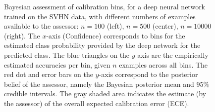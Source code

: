 \documentclass{article}
\begin{document}
\begin{figure}[h]
 \centering

\caption{Bayesian assessment of calibration bins, for a deep neural network trained on the SVHN data, with different numbers of examples available to the assessor: $n=100$ (left), $n=500$ (center), $n=10000$ (right). The $x$-axis (Confidence) corresponds to bins for the estimated class probability provided by the deep network for the predicted class. The blue triangles on the $y$-axis are the empirically estimated accuracies per bin, given $n$ examples across all bins. The red dot and error bars on the $y$-axis correspond to the posterior belief of the assessor, namely the Bayesian posterior mean and 95\% credible intervals. The gray shaded area indicates the estimate (by the assessor) of the overall expected calibration error (ECE).}
\label{fig:betacalibration}
\end{figure}
\end{document}
